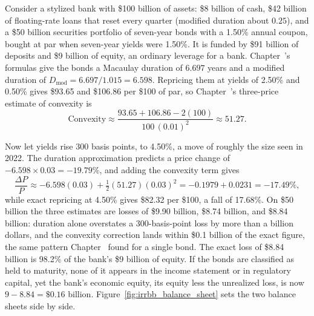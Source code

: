\documentclass[../ai_in_finance]{subfiles}
\begin{document}
Consider a stylized bank with \$100 billion of assets: \$8 billion of cash, \$42 billion of floating-rate loans that reset every quarter (modified duration about $0.25$), and a \$50 billion securities portfolio of seven-year bonds with a 1.50\% annual coupon, bought at par when seven-year yields were 1.50\%. It is funded by \$91 billion of deposits and \$9 billion of equity, an ordinary leverage for a bank. Chapter~'s formulas give the bonds a Macaulay duration of $6.697$ years and a modified duration of $D_{\text{mod}} = 6.697/1.015 = 6.598$. Repricing them at yields of 2.50\% and 0.50\% gives \$93.65 and \$106.86 per \$100 of par, so Chapter~'s three-price estimate of convexity is
\begin{equation*}
\text{Convexity} \approx \frac{93.65 + 106.86 - 2(100)}{100\,(0.01)^2} \approx 51.27.
\end{equation*}

Now let yields rise 300 basis points, to 4.50\%, a move of roughly the size seen in 2022. The duration approximation predicts a price change of $-6.598 \times 0.03 = -19.79\%$, and adding the convexity term gives
\begin{equation*}
\frac{\Delta P}{P} \approx -6.598(0.03) + \tfrac{1}{2}(51.27)(0.03)^2 = -0.1979 + 0.0231 = -17.49\%,
\end{equation*}
while exact repricing at 4.50\% gives \$82.32 per \$100, a fall of 17.68\%. On \$50 billion the three estimates are losses of \$9.90 billion, \$8.74 billion, and \$8.84 billion: duration alone overstates a 300-basis-point loss by more than a billion dollars, and the convexity correction lands within \$0.1 billion of the exact figure, the same pattern Chapter~ found for a single bond.
The exact loss of \$8.84 billion is 98.2\% of the bank's \$9 billion of equity. If the bonds are classified as held to maturity, none of it appears in the income statement or in regulatory capital, yet the bank's economic equity, its equity less the unrealized loss, is now $9 - 8.84 = \$0.16$ billion. Figure~\ref{fig:irrbb_balance_sheet} sets the two balance sheets side by side.
\end{document}
